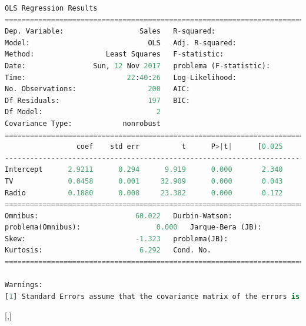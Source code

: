 \begin{lstlisting}[language=Python]
                            OLS Regression Results
==============================================================================
Dep. Variable:                  Sales   R-squared:                       0.897
Model:                            OLS   Adj. R-squared:                  0.896
Method:                 Least Squares   F-statistic:                     859.6
Date:                Sun, 12 Nov 2017   problema (F-statistic):           4.83e-98
Time:                        22:40:26   Log-Likelihood:                -386.20
No. Observations:                 200   AIC:                             778.4
Df Residuals:                     197   BIC:                             788.3
Df Model:                           2
Covariance Type:            nonrobust
==============================================================================
                 coef    std err          t      P>|t|      [0.025      0.975]
------------------------------------------------------------------------------
Intercept      2.9211      0.294      9.919      0.000       2.340       3.502
TV             0.0458      0.001     32.909      0.000       0.043       0.048
Radio          0.1880      0.008     23.382      0.000       0.172       0.204
==============================================================================
Omnibus:                       60.022   Durbin-Watson:                   2.081
problema(Omnibus):                  0.000   Jarque-Bera (JB):              148.679
Skew:                          -1.323   problema(JB):                     5.19e-33
Kurtosis:                       6.292   Cond. No.                         425.
==============================================================================

Warnings:
[1] Standard Errors assume that the covariance matrix of the errors is correctly specified.
\end{lstlisting}

[,]{}

